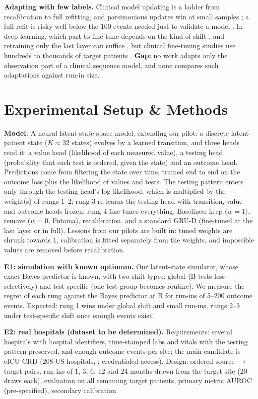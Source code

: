 \documentclass{article}
\theoremstyle{plain}
\theoremstyle{definition}
\theoremstyle{remark}
\begin{document}
\textbf{Adapting with few labels.} Clinical model updating is a ladder from recalibration to full refitting, and parsimonious updates win at small samples \citep{steyerberg2004,vergouwe2017}; a full refit is risky well below the 100 events needed just to validate a model \citep{riley2024}. In deep learning, which part to fine-tune depends on the kind of shift \citep{lee2023}, and retraining only the last layer can suffice \citep{kirichenko2023}, but clinical fine-tuning studies use hundreds to thousands of target patients \citep{moor2023,yaib2024}. \textbf{Gap:} no work adapts only the observation part of a clinical sequence model, and none compares such adaptations against run-in size.

\section{Experimental Setup \& Methods}

\textbf{Model.} A neural latent state-space model, extending our pilot: a discrete latent patient state ($K{\approx}32$ states) evolves by a learned transition, and three heads read it: a value head (likelihood of each measured value), a testing head (probability that each test is ordered, given the state) and an outcome head. Predictions come from filtering the state over time, trained end to end on the outcome loss plus the likelihood of values and tests. The testing pattern enters only through the testing head's log-likelihood, which is multiplied by the weight(s) of rungs 1--2; rung 3 re-learns the testing head with transition, value and outcome heads frozen; rung 4 fine-tunes everything. Baselines: keep ($w{=}1$), remove ($w{=}0$, Futoma), recalibration, and a standard GRU-D (fine-tuned at the last layer or in full). Lessons from our pilots are built in: tuned weights are shrunk towards 1, calibration is fitted separately from the weights, and impossible values are removed before recalibration.

\textbf{E1: simulation with known optimum.} Our latent-state simulator, whose exact Bayes predictor is known, with two shift types: global (B tests less selectively) and test-specific (one test group becomes routine). We measure the regret of each rung against the Bayes predictor at B for run-ins of 5--200 outcome events. Expected: rung 1 wins under global shift and small run-ins, rungs 2--3 under test-specific shift once enough events exist.

\textbf{E2: real hospitals (dataset to be determined).} Requirements: several hospitals with hospital identifiers, time-stamped labs and vitals with the testing pattern preserved, and enough outcome events per site; the main candidate is eICU-CRD (208 US hospitals, \citealp{pollard2018}; credentialed access). Design: ordered source $\to$ target pairs, run-ins of 1, 3, 6, 12 and 24 months drawn from the target site (20 draws each), evaluation on all remaining target patients, primary metric AUROC (pre-specified), secondary calibration.
\end{document}
